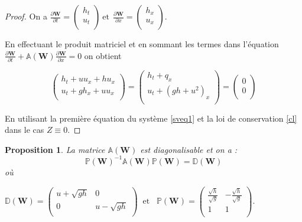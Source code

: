 \documentclass[
11pt, %
francais, %
singlespacing, %
headsepline, %
]{MastersDoctoralThesis} %
\newtheorem{prop}{Proposition}
\begin{document}
\begin{proof}

On a $\frac{\partial\textbf{W}}{\partial t}=\begin{pmatrix}
   h_{t} \\
    u_{t} \\
\end{pmatrix} ~\text{et} ~~ \frac{\partial\textbf{W}}{\partial x}=\begin{pmatrix}
   h_{x} \\
    u_{x} \\
\end{pmatrix}$.

En effectuant le produit matriciel et en sommant les termes dans l'équation  $ \frac{\partial \textbf{W}}{\partial t} +\mathbb{A}(\textbf{W}) \frac{\partial\textbf{W}}{\partial x} = 0 \label{ql} $ on obtient

$$
\begin{pmatrix}
   h_{t} + uu_{x}+hu_{x}\\
    u_{t} + gh_{x}+uu_{x}\\
\end{pmatrix} = \begin{pmatrix}
h_{t} + q_{x} \\
u_{t} + (gh+u^{2})_{x}\\
\end{pmatrix} =
\begin{pmatrix}
0 \\
0\\
\end{pmatrix}
$$

En utilisant la première équation du système \eqref{sveq1} et la loi de conservation \eqref{cl} dans le cas $Z\equiv 0$.

\end{proof}

\begin{prop}
La matrice $\mathbb{A}(\textbf{W})$ est diagonalisable et on a :
$$
\mathbb{P}(\textbf{W})^{-1}\mathbb{A}(\textbf{W})\mathbb{P}(\textbf{W})=\mathbb{D}(\textbf{W})
$$
où 

\begin{center}

$\mathbb{D}(\textbf{W}) =\begin{pmatrix}
   u+\sqrt{gh} & 0  \\
   0 & u-\sqrt{gh}  \\
\end{pmatrix} \phantom{..} \text{et}\phantom{...} \mathbb{P}(\textbf{W}) =\begin{pmatrix}
   \frac{\sqrt{h}}{\sqrt{g}} & -\frac{\sqrt{h}}{\sqrt{g}} \\
   1 & 1  \\
\end{pmatrix}.
$
\end{center}

\end{prop}
\end{document}
